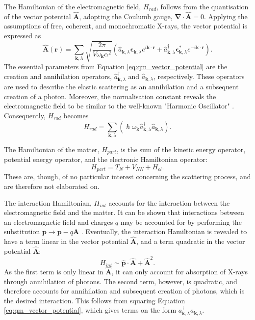The Hamiltonian of the electromagnetic field, $H_{rad}$, follows from the quantisation of the vector potential $\bm{\widehat{A}}$, adopting the Coulumb gauge, $\bm{\nabla} \cdot \bm{\widehat{A}} = 0$.
Applying the assumptions of free, coherent, and monochromatic X-rays, the vector potential is expressed as
\begin{equation}\label{eq:qm_vector_potential}
    \bm{\widehat{A}}(\bm{r}) = \sum_{\bm{k}, \lambda} \sqrt{\frac{2 \pi}{V \omega_{\bm{k}} \alpha^{2}  }} \left( \hat{a}_{\bm{k},\lambda} \bm{\epsilon}_{\bm{k},\lambda} e^{i \bm{k}\cdot\bm{r}} + \hat{a}_{\bm{k},\lambda}^{\dagger} \bm{\epsilon}_{\bm{k},\lambda}^{*} e^{-i \bm{k}\cdot\bm{r}}  \right).
\end{equation}
The essential parameters from Equation \eqref{eq:qm_vector_potential} are the creation and annihilation operators, $\hat{a}_{\bm{k},\lambda}^{\dagger}$ and $\hat{a}_{\bm{k},\lambda}$, respectively.
These operators are used to describe the elastic scattering as an annihilation and a subsequent creation of a photon.
Moreover, the normalisation constant reveals the electromagnetic field to be similar to the well-known "Harmonic Oscillator" \cite{mcmorrow2011elements}. Consequently, $H_{rad}$ becomes
\begin{equation}
    H_{rad} = \sum_{\bm{k}, \lambda} \left( \hslash \omega_{\bm{k}} \hat{a}_{\bm{k},\lambda}^{\dagger} \hat{a}_{\bm{k},\lambda}  \right).
\end{equation}

The Hamiltonian of the matter, $H_{part}$, is the sum of the kinetic energy operator, potential energy operator, and the electronic Hamiltonian operator:
\begin{equation}\label{eq:qm_Hamiltonian_matter}
    H_{part} = T_{N} + V_{NN} + H_{el}.
\end{equation}
These are, though, of no particular interest concerning the scattering process, and are therefore not elaborated on.

The interaction Hamiltonian, $H_{int}$ accounts for the interaction between the electromagnetic field and the matter.
It can be shown that interactions between an electromagnetic field and charges $q$ may be accounted for by performing the substitution
$\bm{p} \rightarrow \bm{p}-q\bm{A}$ \cite{mcmorrow2011elements}. Eventually, the interaction Hamiltonian is revealed to have a term linear in the vector potential $\bm{\widehat{A}}$, and a term quadratic in the vector potential $\bm{\widehat{A}}$:
\begin{equation}\label{eq:qm_interaction_Hamiltonian}
    H_{int} \sim \bm{\widehat{p}} \cdot \bm{\widehat{A}} + \bm{\widehat{A}}^{2}.
\end{equation}
As the first term is only linear in $\bm{\widehat{A}}$, it can only account for absorption of X-rays through annihilation of photons.
The second term, however, is quadratic, and therefore accounts for annihilation and subsequent creation of photons, which is the desired interaction.
This follows from squaring Equation \eqref{eq:qm_vector_potential}, which gives terms on the form $a_{\bm{k},\lambda}^{\dagger} a_{\bm{k},\lambda}$.

